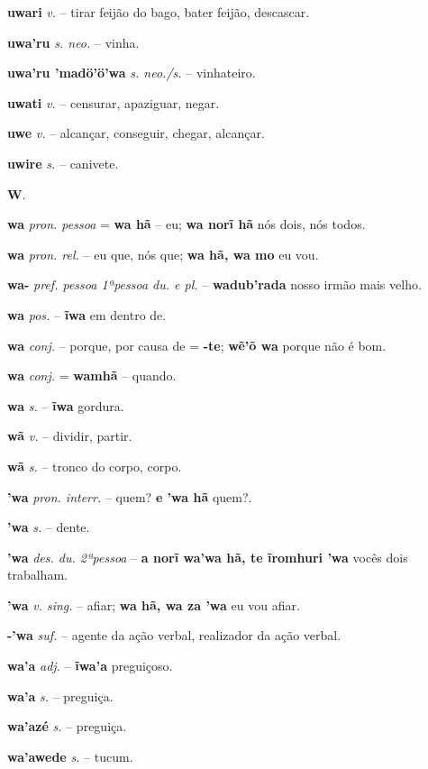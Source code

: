 \textbf{uwari} \textit{v.} -- tirar feijão do bago, bater feijão, descascar.

\textbf{uwa'ru} \textit{s. neo.} -- vinha.

\textbf{uwa'ru 'madö'ö'wa} \textit{s. neo./s.} -- vinhateiro.

\textbf{uwati} \textit{v.} -- censurar, apaziguar, negar.

\textbf{uwe} \textit{v.} -- alcançar, conseguir, chegar, alcançar.

\textbf{uwire} \textit{s.} -- canivete.



\textbf{W}.



\textbf{wa} \textit{pron. pessoa} = \textbf{wa hã} -- eu; \textbf{wa norĩ hã} nós dois, nós todos.

\textbf{wa} \textit{pron. rel.} -- eu que, nós que; \textbf{wa hã, wa mo} eu vou.

\textbf{wa-} \textit{pref. pessoa 1ªpessoa du. e pl.} -- \textbf{wadub'rada} nosso irmão mais velho.

\textbf{wa} \textit{pos.} -- \textbf{ĩwa} em dentro de.

\textbf{wa} \textit{conj.} -- porque, por causa de = \textbf{-te}; \textbf{wẽ'õ wa} porque não é bom.

\textbf{wa} \textit{conj.} = \textbf{wamhã} -- quando.

\textbf{wa} \textit{s.} -- \textbf{ĩwa} gordura.

\textbf{wã} \textit{v.} -- dividir, partir.

\textbf{wã} \textit{s.} -- tronco do corpo, corpo.

\textbf{'wa} \textit{pron. interr.} -- quem? \textbf{e 'wa hã} quem?.

\textbf{'wa} \textit{s.} -- dente.

\textbf{'wa} \textit{des. du. 2ªpessoa} -- \textbf{a norĩ wa'wa hã, te ĩromhuri 'wa} vocês dois trabalham.

\textbf{'wa} \textit{v. sing.} -- afiar; \textbf{wa hã, wa za 'wa} eu vou afiar.

\textbf{-'wa} \textit{suf.} -- agente da ação verbal, realizador da ação verbal.

\textbf{wa'a} \textit{adj.} -- \textbf{ĩwa'a} preguiçoso.

\textbf{wa'a} \textit{s.} -- preguiça.

\textbf{wa'azé} \textit{s.} -- preguiça.

\textbf{wa'awede} \textit{s.} -- tucum.

